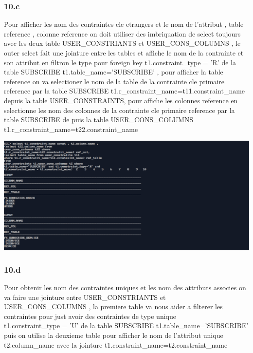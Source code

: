 \subsubsection*{10.c}
Pour afficher les nom des contraintes cle etrangers et le nom de l'attribut , table reference , colonne reference on doit utiliser des imbriquation de select 
toujours avec les deux table USER\_CONSTRIANTS et USER\_CONS\_COLUMNS , le outer select fait une jointure entre les tables et affiche le nom de la contrainte
et son attribut en filtron le type pour foreign key t1.constraint\_type = 'R' de la table SUBSCRIBE t1.table\_name='SUBSCRIBE' , pour afficher la table reference
on va selectioner le nom de la table de la contrainte cle primaire reference par la table SUBSCRIBE t1.r\_constraint\_name=t11.constraint\_name depuis la table
USER\_CONSTRAINTS, pour affiche les colonnes reference
en selectionne les nom des colonnes de la contrainte cle primaire reference par la table SUBSCRIBE de puis la table USER\_CONS\_COLUMNS t1.r\_constraint\_name=t22.constraint\_name 



\begin{center}
    \includegraphics[width=\textwidth]{ScreenShot/Partie5/fr1.png}
\end{center}

\subsubsection*{10.d}
Pour obtenir les nom des contraintes uniques et les nom des attributs associes on va faire
une jointure entre USER\_CONSTRIANTS et USER\_CONS\_COLUMNS , la premiere table va nous aider
a filterer les contraintes pour just avoir des contraintes de type unique \\t1.constraint\_type = 'U' 
de la table SUBSCRIBE t1.table\_name='SUBSCRIBE' puis on utilise la deuxieme table pour afficher le nom de l'attribut unique
t2.column\_name avec la jointure t1.constraint\_name=t2.constraint\_name


